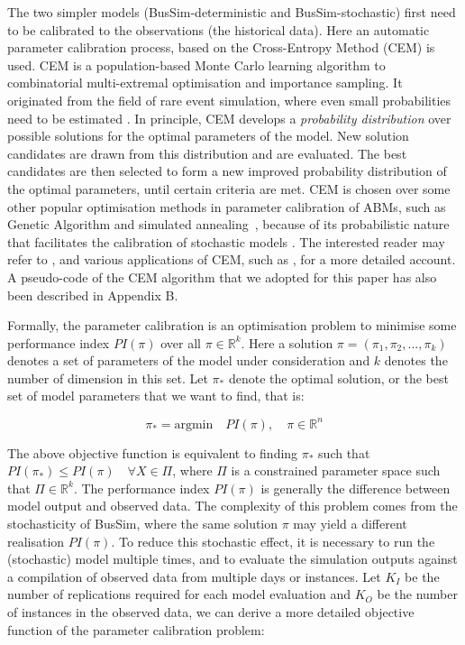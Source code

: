 The two simpler models (BusSim-deterministic and BusSim-stochastic) first need to be calibrated to the observations (the historical data). Here an automatic parameter calibration process, based on the Cross-Entropy Method (CEM) \citep{rubinstein1999cross} is used. CEM is a population-based Monte Carlo learning algorithm to combinatorial multi-extremal optimisation and importance sampling. It originated from the field of rare event simulation, where even small probabilities need to be estimated \citep{rubinstein1999cross}. In principle, CEM develops a \textit{probability distribution} over possible solutions for the optimal parameters of the model. New solution candidates are drawn from this distribution and are evaluated. The best candidates are then selected to form a new improved probability distribution of the optimal parameters, until certain criteria are met. CEM is chosen over some other popular optimisation methods in parameter calibration of ABMs, such as Genetic Algorithm \citep{heppenstall_genetic_2007} and simulated annealing~\citep{pennisi_optimal_2008}, because of its probabilistic nature that facilitates the calibration of stochastic models \citep{ngoduy2012calibration}. The interested reader may refer to \citep{rubinstein1999cross}, and various applications of CEM, such as \citep{ngoduy2012calibration}, for a more detailed account. A pseudo-code of the CEM algorithm that we adopted for this paper has also been described in Appendix B. 

Formally, the parameter calibration is an optimisation problem to minimise some performance index $PI(\pi)$ over all $\pi \in \mathbb{R}^k$. Here a solution $\pi= (\pi_1,\pi_2,...,\pi_k)$ denotes a set of parameters of the model under consideration and $k$ denotes the number of dimension in this set. Let $\pi_*$ denote the optimal solution, or the best set of model parameters that we want to find, that is:

\begin{equation}
    \pi_* = \text{argmin} \quad PI(\pi), \quad \pi \in \mathbb{R}^n
\end{equation}

The above objective function is equivalent to finding $\pi_*$ such that $PI(\pi_*) \leq PI(\pi) \quad \forall X \in \Pi$, where $\Pi$ is a constrained parameter space such that $\Pi \in \mathbb{R}^k$. The performance index $PI(\pi)$ is generally the difference between model output and observed data. The complexity of this problem comes from the stochasticity of BusSim, where the same solution $\pi$ may yield a different realisation $PI(\pi)$. To reduce this stochastic effect, it is necessary to run the (stochastic) model multiple times, and to evaluate the simulation outputs against a compilation of observed data from multiple days or instances. Let $K_I$ be the number of replications required for each model evaluation and $K_O$ be the number of instances in the observed data, we can derive a more detailed objective function of the parameter calibration problem: 

